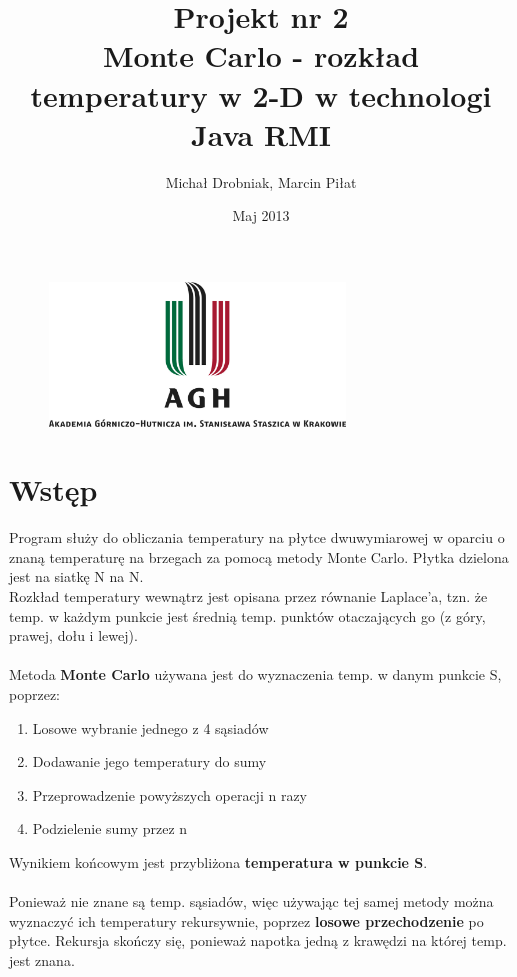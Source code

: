 \documentclass[11pt,a4paper]{article}
\begin{document}
\title{\LARGE  Projekt nr 2 \\ \vspace{0.4cm} \textbf{Monte Carlo - rozkład temperatury w 2-D} w technologi Java RMI}
\author{Michał Drobniak, 
 Marcin Piłat }
\date{Maj 2013}
\maketitle

\vfill
\begin{figure}[H]
\begin{center}
\includegraphics[width=0.7\textwidth]{agh_nzw_s_pl_1w_wbr_rgb_150ppi.jpg}
\end{center}
\end{figure}
\newpage

\section{Wstęp}

Program służy do obliczania temperatury na płytce dwuwymiarowej w oparciu o znaną temperaturę na brzegach za pomocą metody Monte Carlo. Płytka dzielona jest na siatkę N na N.\\
Rozkład temperatury wewnątrz jest opisana przez równanie Laplace'a, tzn. że temp. w każdym punkcie jest średnią temp. punktów otaczających go (z góry, prawej, dołu i lewej).\\
\\
Metoda \textbf{Monte Carlo} używana jest do wyznaczenia temp. w danym punkcie S, poprzez:
\begin{enumerate}
	\item Losowe wybranie jednego z 4 sąsiadów
	\item Dodawanie jego temperatury do sumy
	\item Przeprowadzenie powyższych operacji n razy
	\item Podzielenie sumy przez n
\end{enumerate}
Wynikiem końcowym jest przybliżona \textbf{temperatura w punkcie S}.\\
\\
Ponieważ nie znane są temp. sąsiadów, więc używając tej samej metody można wyznaczyć ich temperatury rekursywnie, poprzez \textbf{losowe przechodzenie} po płytce. Rekursja skończy się, ponieważ napotka jedną z krawędzi na której temp. jest znana.
\end{document}
